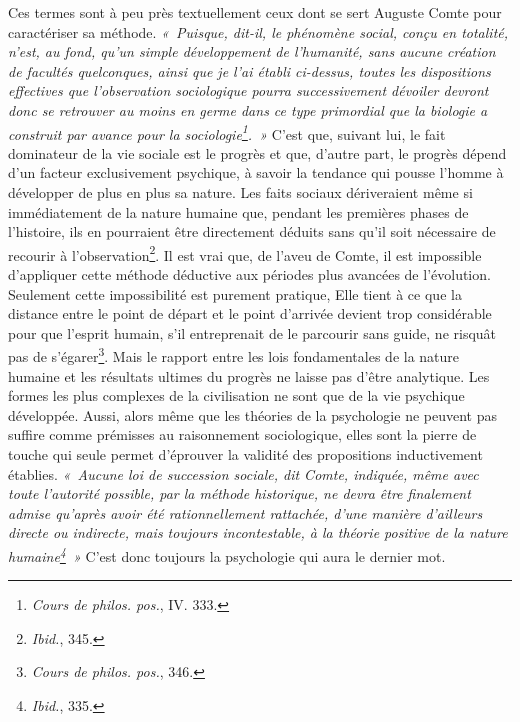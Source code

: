 \documentclass[french,twoside]{book} %
\begin{document}
Ces termes sont à peu près textuellement ceux dont se sert Auguste Comte pour caractériser sa méthode. \emph{« Puisque, dit-il, le phénomène social, conçu en totalité, n’est, au fond, qu’un simple développement de l’humanité, sans aucune création de facultés quelconques, ainsi que je l’ai établi ci-dessus, toutes les dispositions effectives que l’observation sociologique pourra successivement dévoiler devront donc se retrouver au moins en germe dans ce type primordial que la biologie a construit par avance pour la sociologie\footnote{\emph{Cours de philos. pos.}, IV. 333.}. »} C’est que, suivant lui, le fait dominateur de la vie sociale est le progrès et que, d’autre part, le progrès dépend d’un facteur exclusivement psychique, à savoir la tendance qui pousse l’homme à développer de plus en plus sa nature. Les faits sociaux dériveraient même si immédiatement de la nature humaine que, pendant les premières phases de l’histoire, ils en pourraient être directement déduits sans qu’il soit nécessaire de recourir à l’observation\footnote{{\itshape Ibid.}, 345.}. Il est vrai que, de l’aveu de Comte, il est impossible d’appliquer cette méthode déductive aux périodes plus avancées de l’évolution. Seulement cette impossibilité est purement pratique, Elle tient à ce que la distance entre le point de départ et le point d’arrivée devient trop considérable pour que l’esprit humain, s’il entreprenait de le parcourir sans guide, ne risquât pas de s’égarer\footnote{\emph{Cours de philos. pos.}, 346.}. Mais le rapport entre les lois fondamentales de la nature humaine et les résultats ultimes du progrès ne laisse pas d’être analytique. Les formes les plus complexes de la civilisation ne sont que de la vie psychique développée. Aussi, alors même que les théories de la psychologie ne peuvent pas suffire comme prémisses au raisonnement sociologique, elles sont la pierre de touche qui seule permet d’éprouver la validité des propositions inductivement établies. \emph{« Aucune loi de succession sociale, dit Comte, indiquée, même avec toute l’autorité possible, par la méthode historique, ne devra être finalement admise qu’après avoir été rationnellement rattachée, d’une manière d’ailleurs directe ou indirecte, mais toujours incontestable, à la théorie positive de la nature humaine\footnote{{\itshape Ibid.}, 335.} »} C’est donc toujours la psychologie qui aura le dernier mot.\par
\end{document}
